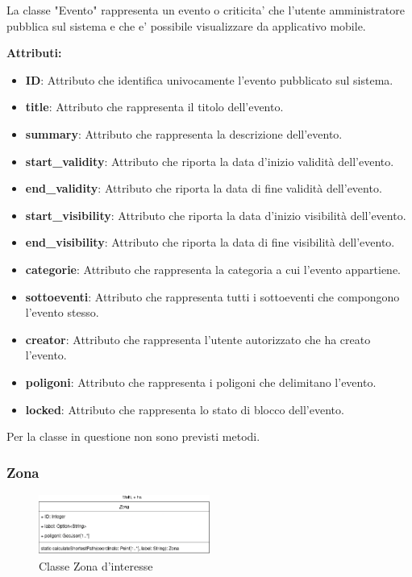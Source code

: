 La classe "Evento" rappresenta un evento o criticita' che l'utente amministratore pubblica sul sistema e che e' possibile visualizzare da applicativo mobile.

\textbf{Attributi:}\\
\begin{itemize}
    \item \textbf{ID}: Attributo che identifica univocamente l'evento pubblicato sul sistema.
    \item \textbf{title}: Attributo che rappresenta il titolo dell'evento.
    \item \textbf{summary}: Attributo che rappresenta la descrizione dell'evento.
    \item \textbf{start\_validity}: Attributo che riporta la data d'inizio validità dell'evento.
    \item \textbf{end\_validity}: Attributo che riporta la data di fine validità dell'evento.
    \item \textbf{start\_visibility}: Attributo che riporta la data d'inizio visibilità dell'evento.
    \item \textbf{end\_visibility}: Attributo che riporta la data di fine visibilità dell'evento.
    \item \textbf{categorie}: Attributo che rappresenta la categoria a cui l'evento appartiene.
    \item \textbf{sottoeventi}: Attributo che rappresenta tutti i sottoeventi che compongono l'evento stesso.
    \item \textbf{creator}: Attributo che rappresenta l'utente autorizzato che ha creato l'evento.
    \item \textbf{poligoni}: Attributo che rappresenta i poligoni che delimitano l'evento.
    \item \textbf{locked}: Attributo che rappresenta lo stato di blocco dell'evento.
\end{itemize}

Per la classe in questione non sono previsti metodi.

\clearpage 

\subsubsection{Zona}

\begin{figure}[htbp]
    \centering
    \includegraphics[width=0.5\textwidth]{Images/Zona-Class.png}
    \caption{Classe Zona d'interesse}
    \label{fig:zona}
\end{figure}

